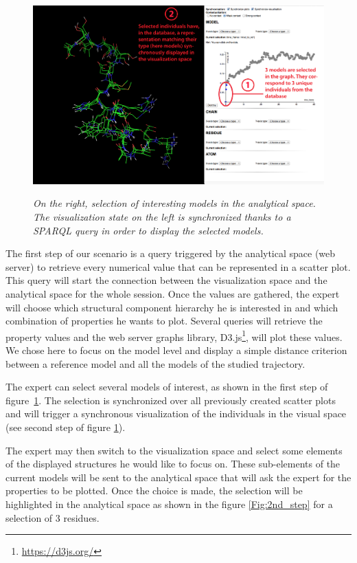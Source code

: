 \documentclass{vgtc}                          %
\begin{document}
\begin{figure}[!htb]
  \centering
  {\includegraphics[width=\linewidth,frame]{./figures/scenario_step_1_cropped}}
    \caption[]{{\it On the right, selection of interesting models in the analytical space. The visualization state on the left is synchronized thanks to a SPARQL query in order to display the selected models.}}
  \label{Fig:1st_step}
\end{figure}

The first step of our scenario is a query triggered by the analytical space (web server) to retrieve every numerical value that can be represented in a scatter plot. This query will start the connection between the visualization space and the analytical space for the whole session. 
Once the values are gathered, the expert will choose which structural component hierarchy he is interested in and which combination of properties he wants to plot. Several queries will retrieve the property values and the web server graphs library, D3.js\footnote{\url{https://d3js.org/}}, will plot these values. We chose here to focus on the model level and display a simple distance criterion between a reference model and all the models of the studied trajectory.

The expert can select several models of interest, as shown in the first step of figure~\ref{Fig:1st_step}. The selection is synchronized over all previously created scatter plots and will trigger a synchronous visualization of the individuals in the visual space (see second step of figure \ref{Fig:1st_step}).

The expert may then switch to the visualization space and select some elements of the displayed structures he would like to focus on. These sub-elements of the current models will be sent to the analytical space that will ask the expert for the properties to be plotted. Once the choice is made, the selection will be highlighted in the analytical space as shown in the figure \ref{Fig:2nd_step} for a selection of 3 residues.
\end{document}

